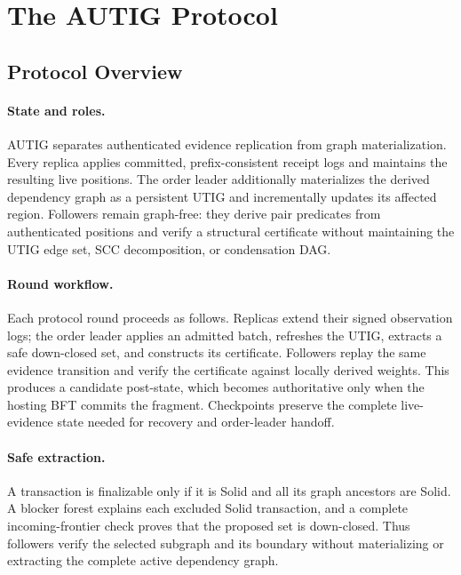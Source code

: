 \section{The AUTIG Protocol}
\label{sec:protocol}

\subsection{Protocol Overview}
\label{sec:protocol-overview}

\paragraph{State and roles.}
AUTIG separates authenticated evidence replication from graph materialization.
Every replica applies committed, prefix-consistent receipt logs and maintains
the resulting live positions.  The order leader additionally materializes the
derived dependency graph as a persistent UTIG and incrementally updates its
affected region.  Followers remain graph-free: they derive pair predicates
from authenticated positions and verify a structural certificate without
maintaining the UTIG edge set, SCC decomposition, or condensation DAG.

\paragraph{Round workflow.}
Each protocol round proceeds as follows.  Replicas extend their signed
observation logs; the order leader applies an admitted batch, refreshes the
UTIG, extracts a safe down-closed set, and constructs its certificate.
Followers replay the same evidence transition and verify the certificate
against locally derived weights.  This produces a candidate post-state, which
becomes authoritative only when the hosting BFT commits the fragment.
Checkpoints preserve the complete live-evidence state needed for recovery and
order-leader handoff.

\paragraph{Safe extraction.}
A transaction is finalizable only if it is Solid and all its graph ancestors
are Solid.  A blocker forest explains each excluded Solid transaction, and a
complete incoming-frontier check proves that the proposed set is down-closed.
Thus followers verify the selected subgraph and its boundary without
materializing or extracting the complete active dependency graph.

